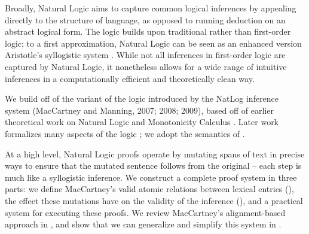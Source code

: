 Broadly, Natural Logic aims to capture common logical
  inferences by appealing directly to the structure of language,
  as opposed to running deduction on an abstract logical form.
The logic builds upon traditional rather than first-order logic;
  to a first approximation, Natural Logic can be seen as
  an enhanced version Aristotle's syllogistic system
  \cite{key:2008vanbenthem-natlog}.
While not all inferences in first-order logic are captured by 
  Natural Logic,
  it nonetheless allows for a wide range of intuitive inferences in
  a computationally efficient and theoretically clean way.

We build off of the variant of the logic introduced by
  the NatLog inference system (MacCartney and Manning, 2007; 2008; 2009),
  \nocite{key:2007maccartney-natlog}
  \nocite{key:2008maccartney-natlog}
  \nocite{key:2009maccartney-natlog}
  based off of earlier theoretical work on Natural Logic and 
  Monotonicity Calculus
  \cite{key:1986benthem-natlog,key:1991valencia-natlog}.
Later work formalizes many aspects of the logic
  \cite{key:2012icard-natlog,key:2013djalali-natlog};
  we adopt the semantics of
  .

At a high level, Natural Logic proofs operate by mutating spans of text
  in precise ways to ensure that the mutated sentence follows from the
  original -- each step is much like a syllogistic inference.
We construct a complete proof system in three parts:
  we define MacCartney's valid atomic relations between lexical entries
  (), the effect these mutations have
  on the validity of the inference (),
  and a practical system for executing these proofs.
We review MacCartney's alignment-based approach in
  , and show that we can generalize and
  simplify this system in .

